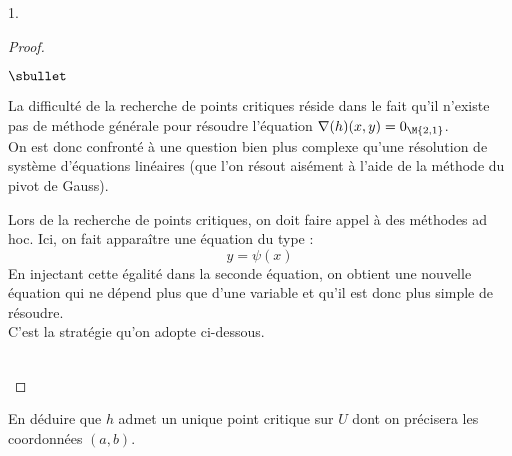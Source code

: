 \documentclass[11pt]{article}%
\begin{document}
\begin{noliste}{1.}
\begin{proof}
\begin{remarkL}{.98}
\begin{noliste}{$\sbullet$}
      \item La difficulté de la recherche de points critiques réside
        dans le fait qu'il n'existe pas de méthode générale pour
        résoudre l'équation $\nabla(h)(x,y) = 0_{\M{2,1}}$.\\
        On est donc confronté à une question bien plus complexe qu'une
        résolution de système d'équations linéaires (que l'on résout
        aisément à l'aide de la méthode du pivot de Gauss).

      \item Lors de la recherche de points critiques, on doit faire
        appel à des méthodes ad hoc. Ici, on fait apparaître une
        équation du type :
        \[
        y = \psi(x)
        \]
        En injectant cette égalité dans la seconde équation, on
        obtient une nouvelle équation qui ne dépend plus que d'une
        variable et qu'il est donc plus simple de résoudre.\\
        C'est la stratégie qu'on adopte ci-dessous.
      \end{noliste}
    \end{remarkL}~\\[-1.4cm]
  \end{proof}


  \newpage


\item En déduire que $h$ admet un unique point critique sur $U$ dont
  on précisera les coordonnées $(a,b)$.


\end{noliste}
\end{document}
